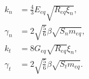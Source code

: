 \begin{equation}
\begin{aligned}
	k_n &= \frac{4}{3} E_{eq} \sqrt{R_{eq} \xi_n} ,\\
	\gamma_n &= 2 \sqrt{\frac{5}{6}} \beta \sqrt{S_n m_{eq}} ,\\
	k_t &= 8 G_{eq} \sqrt{R_{eq}} \xi_n ,\\
	\gamma_t &= 2 \sqrt{\frac{5}{6}} \beta \sqrt{S_t m_{eq}} .
\end{aligned}
\label{eq:hertz}
\end{equation}
